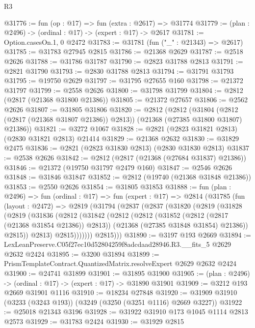 \begin{lexlean}{R3}
\begin{coremodule}
@31776 := fun (op : @17) => fun (extra : @2617) => @31774
@31779 := (plan : @2496) -> (ordinal : @17) -> (expert : @17) -> @2617
@31781 := Option.casesOn.{1, 0} @2472
@31783 := @31781 (fun ("_" : @21343) => @2617)
@31785 := @31783 @27945 @2815
@31786 := @21368 @2629
@31787 := @2518 @2626
@31788 := @31786 @31787
@31790 := @2823 @31788 @2813
@31791 := @2821 @31790
@31793 := @2830 @31788 @2813
@31794 := @31791 @31793
@31795 := @19750 @2629
@31797 := @31795 @27655 @160
@31798 := @21372 @31797
@31799 := @2558 @2626
@31800 := @31798 @31799
@31804 := @2812 (@2817 (@21368 @31800 @21386))
@31805 := @21372 @27657
@31806 := @2562 @2626
@31807 := @31805 @31806
@31820 := @2812
    (@2812
      (@31804 (@2812 (@2817 (@21368 @31807 @21386)) @2813))
      (@21368 (@27385 @31800 @31807) @21386))
@31821 := @3272 @1067
@31828 := @2821 (@2823 @31821 @2813) (@2830 @31821 @2813) @21414
@31829 := @21368 @2632
@31830 := @31829 @2475
@31836 := @2821 (@2823 @31830 @2813) (@2830 @31830 @2813)
@31837 := @2538 @2626
@31842 := @2812 (@2817 (@21368 (@27684 @31837) @21386))
@31846 := @21372 (@19750 @31797 @2479 @160)
@31847 := @2546 @2626
@31848 := @31846 @31847
@31852 := @2812 (@19740 (@21368 @31848 @21386))
@31853 := @2550 @2626
@31854 := @31805 @31853
@31888 := fun (plan : @2496) =>
  fun (ordinal : @17) =>
  fun (expert : @17) =>
  @2814
    (@31785
      (fun (layout : @2472) =>
      @2819
        (@31794
          (@2837
            (@2837
              (@31820
                (@2819
                  (@31828
                    (@2819
                      (@31836
                        (@2812
                          (@31842
                            (@2812
                              (@2812
                                (@31852 (@2812 (@2817 (@21368 @31854 @21386)) @2813))
                                (@21368 (@27385 @31848 @31854) @21386))
                              @2815))
                          @2813)
                        @2815)))))))
          @2815)))
@31890 := @3197 @193 @2669
@31894 := LexLeanPreserve.C05f27ec10d52804259f8adcdaad28946.R3.__fits_5 @2629 @2632 @2424
@31895 := @3200 @31894
@31899 := PrismTemplateContract.QuantizedMatrix.resolveExpert @2629 @2632 @2424
@31900 := @24741 @31899
@31901 := @31895 @31900
@31905 := (plan : @2496) -> (ordinal : @17) -> (expert : @17) -> @31890 @31901
@31909 := @3212 @193 @2669 @31901 @1116
@31910 := @18234 @27848
@31920 := @31909 @31910 (@3233 (@3243 @193)) (@3249 (@3250 (@3251 @1116) @2669 @3227))
@31922 := @25018 @21343 @3196
@31928 := @31922 @31910 @173 @1045 @1114 @2813 @2573
@31929 := @31783 @2424
@31930 := @31929 @2815

\end{coremodule}
\end{lexlean}
